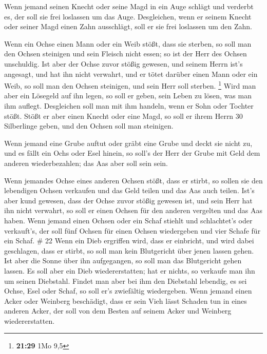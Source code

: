  Wenn jemand seinen Knecht oder seine Magd in ein Auge
schlägt und verderbt es, der soll sie frei loslassen um das Auge.
 Desgleichen, wenn er seinem Knecht oder seiner Magd einen
Zahn ausschlägt, soll er sie frei loslassen um den Zahn.

 Wenn ein Ochse einen Mann oder ein Weib stößt, dass sie
sterben, so soll man den Ochsen steinigen und sein Fleisch nicht essen;
so ist der Herr des Ochsen unschuldig.  Ist aber der Ochse
zuvor stößig gewesen, und seinem Herrn ist's angesagt, und hat ihn nicht
verwahrt, und er tötet darüber einen Mann oder ein Weib, so soll man den
Ochsen steinigen, und sein Herr soll sterben. \footnote{\textbf{21:29}
  1Mo 9,5}  Wird man aber ein Lösegeld auf ihn legen, so
soll er geben, sein Leben zu lösen, was man ihm auflegt. 
Desgleichen soll man mit ihm handeln, wenn er Sohn oder Tochter stößt.
 Stößt er aber einen Knecht oder eine Magd, so soll er
ihrem Herrn 30 Silberlinge geben, und den Ochsen soll man steinigen.

 Wenn jemand eine Grube auftut oder gräbt eine Grube und
deckt sie nicht zu, und es fällt ein Ochs oder Esel hinein,
 so soll's der Herr der Grube mit Geld dem anderen
wiederbezahlen; das Aas aber soll sein sein.

 Wenn jemandes Ochse eines anderen Ochsen stößt, dass er
stirbt, so sollen sie den lebendigen Ochsen verkaufen und das Geld
teilen und das Aas auch teilen.  Ist's aber kund gewesen,
dass der Ochse zuvor stößig gewesen ist, und sein Herr hat ihn nicht
verwahrt, so soll er einen Ochsen für den anderen vergelten und das Aas
haben.  Wenn jemand einen Ochsen oder ein Schaf stiehlt und
schlachtet's oder verkauft's, der soll fünf Ochsen für einen Ochsen
wiedergeben und vier Schafe für ein Schaf. \# 22  Wenn ein
Dieb ergriffen wird, dass er einbricht, und wird dabei geschlagen, dass
er stirbt, so soll man kein Blutgericht über jenen lassen gehen.
 Ist aber die Sonne über ihn aufgegangen, so soll man das
Blutgericht gehen lassen. Es soll aber ein Dieb wiedererstatten; hat er
nichts, so verkaufe man ihn um seinen Diebstahl.  Findet man
aber bei ihm den Diebstahl lebendig, es sei Ochse, Esel oder Schaf, so
soll er's zwiefältig wiedergeben.  Wenn jemand einen Acker
oder Weinberg beschädigt, dass er sein Vieh lässt Schaden tun in eines
anderen Acker, der soll von dem Besten auf seinem Acker und Weinberg
wiedererstatten.


